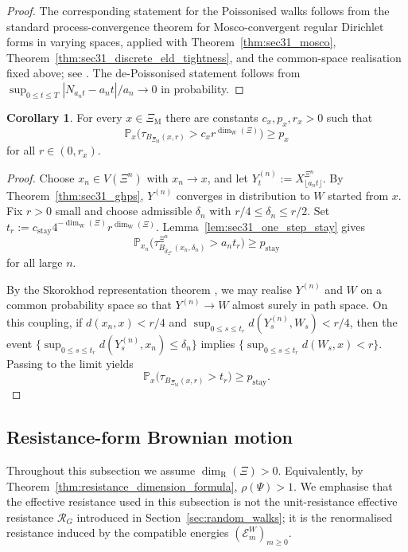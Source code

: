 \documentclass{article}
\theoremstyle{plain}
\theoremstyle{definition}
\newtheorem{corollary}[theorem]{Corollary}
\newcommand{\Reff}{\mathscr{R}}
\newcommand{\dimwalk}{\dim_\mathrm{W}}
\newcommand{\dimresis}{\dim_\mathrm{R}}
\begin{document}
\begin{proof}
The corresponding statement for the Poissonised walks follows from the standard process-convergence theorem for Mosco-convergent regular Dirichlet forms in varying spaces, applied with Theorem~\ref{thm:sec31_mosco}, Theorem~\ref{thm:sec31_discrete_eld_tightness}, and the common-space realisation fixed above; see \cite{kuwae2003convergence,fukushima1994dirichlet,billingsley1999convergence}.
The de-Poissonised statement follows from $\sup_{0\le t\le T}|N_{a_nt}-a_nt|/a_n\to 0$ in probability.
\end{proof}

\begin{corollary}\label{cor:sec31_continuous_stay}
For every $x\in \Xi_{\mathrm M}$ there are constants $c_x,p_x,r_x>0$ such that
\[
\mathbb P_x\bigl(\tau_{B_{\Xi_{\mathrm M}}(x,r)}>c_xr^{\dimwalk(\Xi)}\bigr)\ge p_x
\]
for all $r\in(0,r_x)$.
\end{corollary}

\begin{proof}
Choose $x_n\in V(\Xi^n)$ with $x_n\to x$, and let $Y_t^{(n)}:=X_{\lfloor a_nt\rfloor}^{\Xi^n}$.
By Theorem~\ref{thm:sec31_ghps}, $Y^{(n)}$ converges in distribution to $W$ started from $x$.
Fix $r>0$ small and choose admissible $\delta_n$ with $r/4\le \delta_n\le r/2$.
Set $t_r:=c_{\mathrm{stay}}4^{-\dimwalk(\Xi)}r^{\dimwalk(\Xi)}$.
Lemma~\ref{lem:sec31_one_step_stay} gives
\[
\mathbb P_{x_n}\bigl(\tau_{B_{\hat d_{\Xi^n}}(x_n,\delta_n)}^{\Xi^n}>a_nt_r\bigr)\ge p_{\mathrm{stay}}
\]
for all large $n$.

By the Skorokhod representation theorem \cite{billingsley1999convergence}, we may realise $Y^{(n)}$ and $W$ on a common probability space so that $Y^{(n)}\to W$ almost surely in path space.
On this coupling, if $d(x_n,x)<r/4$ and $\sup_{0\le s\le t_r}d(Y_s^{(n)},W_s)<r/4$, then the event $\{\sup_{0\le s\le t_r}d(Y_s^{(n)},x_n)\le \delta_n\}$ implies $\{\sup_{0\le s\le t_r}d(W_s,x)<r\}$.
Passing to the limit yields
\[
\mathbb P_x\bigl(\tau_{B_{\Xi_{\mathrm M}}(x,r)}>t_r\bigr)\ge p_{\mathrm{stay}}.
\]
\end{proof}


\subsection{Resistance-form Brownian motion}\label{subsec:resistance_form}

Throughout this subsection we assume $\dimresis(\Xi)>0$.
Equivalently, by Theorem~\ref{thm:resistance_dimension_formula}, $\rho(\Psi)>1$.
We emphasise that the effective resistance used in this subsection is not the unit-resistance effective resistance $\Reff_G$ introduced in Section~\ref{sec:random_walks}; it is the renormalised resistance induced by the compatible energies $(\mathcal E_m^W)_{m\ge 0}$.
\end{document}
